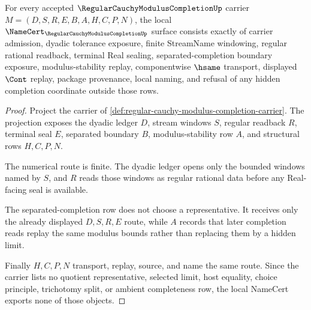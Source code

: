 \begin{theorem}
\label{thm:regular-cauchy-modulus-completion-namecert-obligations}
For every accepted $\RegularCauchyModulusCompletionUp$ carrier $M=(D,S,R,E,B,A,H,C,P,N)$, the local $\NameCert_{\RegularCauchyModulusCompletionUp}$ surface consists exactly of carrier admission, dyadic tolerance exposure, finite StreamName windowing, regular rational readback, terminal Real sealing, separated-completion boundary exposure, modulus-stability replay, componentwise $\hsame$ transport, displayed $\Cont$ replay, package provenance, local naming, and refusal of any hidden completion coordinate outside those rows.
\end{theorem}
\begin{proof}
Project the carrier of \autoref{def:regular-cauchy-modulus-completion-carrier}. The projection exposes the dyadic ledger $D$, stream windows $S$, regular readback $R$, terminal seal $E$, separated boundary $B$, modulus-stability row $A$, and structural rows $H,C,P,N$.

The numerical route is finite. The dyadic ledger opens only the bounded windows named by $S$, and $R$ reads those windows as regular rational data before any Real-facing seal is available.

The separated-completion row does not choose a representative. It receives only the already displayed $D,S,R,E$ route, while $A$ records that later completion reads replay the same modulus bounds rather than replacing them by a hidden limit.

Finally $H,C,P,N$ transport, replay, source, and name the same route. Since the carrier lists no quotient representative, selected limit, host equality, choice principle, trichotomy split, or ambient completeness row, the local NameCert exports none of those objects.
\end{proof}

